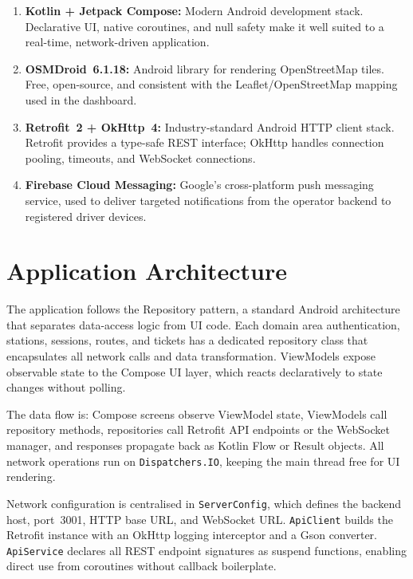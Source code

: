 \documentclass[12pt,a4paper]{report}
\begin{document}
\begin{enumerate}
  \item \textbf{Kotlin + Jetpack Compose:} Modern Android development stack. Declarative UI,
        native coroutines, and null safety make it well suited to a real-time, network-driven
        application.
  \item \textbf{OSMDroid~6.1.18:} Android library for rendering OpenStreetMap tiles. Free,
        open-source, and consistent with the Leaflet/OpenStreetMap mapping used in the dashboard.
  \item \textbf{Retrofit~2 + OkHttp~4:} Industry-standard Android HTTP client stack. Retrofit
        provides a type-safe REST interface; OkHttp handles connection pooling, timeouts, and
        WebSocket connections.
  \item \textbf{Firebase Cloud Messaging:} Google's cross-platform push messaging service, used
        to deliver targeted notifications from the operator backend to registered driver devices.
\end{enumerate}

\section{Application Architecture}

The application follows the Repository pattern, a standard Android architecture that separates
data-access logic from UI code. Each domain area authentication, stations, sessions, routes,
and tickets has a dedicated repository class that encapsulates all network calls and data
transformation. ViewModels expose observable state to the Compose UI layer, which reacts
declaratively to state changes without polling.

The data flow is: Compose screens observe ViewModel state, ViewModels call repository methods,
repositories call Retrofit API endpoints or the WebSocket manager, and responses propagate back
as Kotlin Flow or Result objects. All network operations run on \texttt{Dispatchers.IO}, keeping
the main thread free for UI rendering.

\begin{sloppypar}
Network configuration is centralised in \texttt{ServerConfig}, which defines the backend host,
port~3001, HTTP base URL, and WebSocket URL. \texttt{ApiClient} builds the Retrofit instance
with an OkHttp logging interceptor and a Gson converter. \texttt{ApiService} declares all REST
endpoint signatures as suspend functions, enabling direct use from coroutines without callback
boilerplate.
\end{sloppypar}
\end{document}
